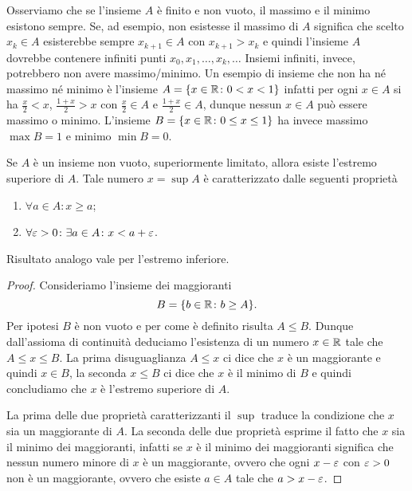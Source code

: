 Osserviamo che se l'insieme $A$ è finito e non vuoto,
il massimo e il minimo esistono
sempre.
Se, ad esempio, non esistesse il massimo di $A$ significa che scelto
$x_k\in A$ esisterebbe sempre $x_{k+1}\in A$ con $x_{k+1} > x_k$ e quindi l'insieme
$A$ dovrebbe contenere infiniti punti $x_0,x_1, \dots, x_k,\dots $
Insiemi infiniti, invece, potrebbero non avere massimo/minimo.
Un esempio di insieme che non ha né massimo né minimo è
l'insieme $A = {\left\{ x\in \mathbb R\colon 0<x<1 \right\}}$ infatti per ogni
$x\in A$ si ha $\frac x 2<x$, $\frac{1+x}{2}>x$
con $\frac x 2\in A$ e $\frac{1+x}{2}\in A$,
dunque nessun $x\in A$ può essere
massimo o minimo. L'insieme $B={\left\{ x\in \mathbb R \colon 0\le x \le 1 \right\}}$
ha invece massimo $\max B= 1$ e minimo $\min B=0$.

\begin{theorem}
  \label{th:sup}
  \mymark{**}
  Se $A$ è un insieme non vuoto,
  superiormente limitato, allora esiste l'estremo superiore di $A$.
  Tale numero $x=\sup A$ è caratterizzato dalle seguenti proprietà
  \begin{enumerate}
  \item $\forall a\in A\colon x \ge a$;
  \item $\forall \varepsilon>0\colon \exists a\in A \colon x < a + \varepsilon$.
  \end{enumerate}

  Risultato analogo vale per l'estremo inferiore.
  \end{theorem}
  \begin{proof}
  \mymark{*}
  Consideriamo l'insieme dei maggioranti
  \[
  B = {\left\{  b\in \mathbb R \colon b \ge A \right\}}.
  \]
  Per ipotesi $B$ è non vuoto e per come è definito risulta $A\le B$.
  Dunque dall'assioma di continuità deduciamo l'esistenza di un numero $x\in \mathbb R$
  tale che $A\le x \le B$. La prima disuguaglianza $A\le x$ ci dice che $x$ è un
  maggiorante e quindi $x\in B$, la seconda $x\le B$ ci dice che $x$ è il minimo
  di $B$ e quindi concludiamo che $x$ è l'estremo superiore di $A$.

  La prima delle due proprietà caratterizzanti il $\sup$ traduce la condizione
  che $x$ sia un maggiorante di $A$. La seconda delle due proprietà esprime il
  fatto che $x$ sia il minimo dei maggioranti, infatti se $x$ è il minimo
  dei maggioranti significa che nessun numero minore di $x$ è un maggiorante, ovvero
  che ogni $x-\varepsilon$ con $\varepsilon>0$ non è un maggiorante, ovvero
  che esiste $a\in A$ tale che $a > x-\varepsilon$.
\end{proof}

